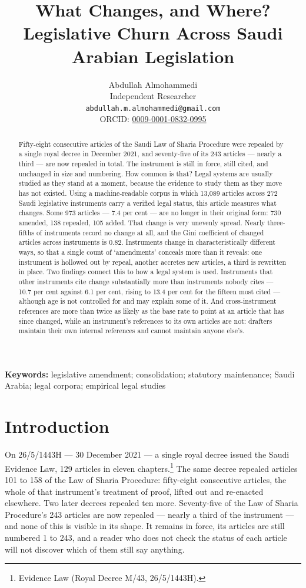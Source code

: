 \documentclass[11pt]{article}
\title{What Changes, and Where?\\
Legislative Churn Across Saudi Arabian Legislation}
\author{}
\date{}
\author{Abdullah Almohammedi \\
    Independent Researcher \\
    \texttt{abdullah.m.almohammedi@gmail.com} \\
    ORCID: \href{https://orcid.org/0009-0001-0832-0995}{0009-0001-0832-0995}}
\date{}
\begin{document}
\maketitle

\begin{abstract}
\noindent
Fifty-eight consecutive articles of the Saudi Law of Sharia Procedure were
repealed by a single royal decree in December 2021, and seventy-five of its
243 articles --- nearly a third --- are now repealed in total. The instrument
is still in force, still cited, and unchanged in size and numbering. How
common is that? Legal systems are usually studied as they stand at a moment,
because the evidence to study them as they move has not existed. Using a
machine-readable corpus in which 13,089 articles across 272 Saudi legislative
instruments carry a verified legal status, this article measures what
changes. Some 973 articles --- 7.4 per cent --- are no longer in their
original form: 730 amended, 138 repealed, 105 added. That change is very
unevenly spread. Nearly three-fifths of instruments record no change at all,
and the Gini coefficient of changed articles across instruments is 0.82.
Instruments change in characteristically different ways, so that a single
count of `amendments' conceals more than it reveals: one instrument is
hollowed out by repeal, another accretes new articles, a third is rewritten
in place. Two findings connect this to how a legal system is used. Instruments
that other instruments cite change substantially more than instruments nobody
cites --- 10.7 per cent against 6.1 per cent, rising to 13.4 per cent for the
fifteen most cited --- although age is not controlled for and may explain some
of it. And cross-instrument references are more than twice as likely as the
base rate to point at an article that has since changed, while an instrument's
references to its own articles are not: drafters maintain their own internal
references and cannot maintain anyone else's.
\end{abstract}

\vspace{1em}\noindent\textbf{Keywords:} legislative amendment; consolidation;
statutory maintenance; Saudi Arabia; legal corpora; empirical legal studies
\vspace{1.5em}

\section{Introduction}

On 26/5/1443H --- 30 December 2021 --- a single royal decree issued the Saudi
Evidence Law, 129 articles in eleven chapters.\footnote{Evidence Law (Royal
Decree M/43, 26/5/1443H).} The same decree repealed articles 101 to 158 of the
Law of Sharia Procedure: fifty-eight consecutive articles, the whole of that
instrument's treatment of proof, lifted out and re-enacted elsewhere. Two
later decrees repealed ten more. Seventy-five of the Law of Sharia Procedure's
243 articles are now repealed --- nearly a third of the instrument --- and
none of this is visible in its shape. It remains in force, its articles are
still numbered 1 to 243, and a reader who does not check the status of each
article will not discover which of them still say anything.
\end{document}
